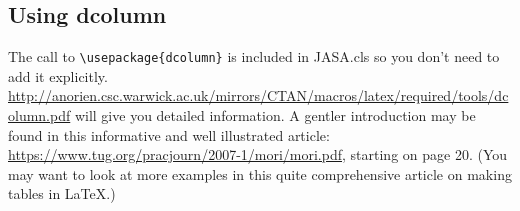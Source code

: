 \documentclass[reprint]{JASA}
\begin{document}
\clearpage


\subsection{Using dcolumn}
The call to \verb+\usepackage{dcolumn}+ is included in JASA.cls so you
don't need to add it explicitly.
\href{http://anorien.csc.warwick.ac.uk/mirrors/CTAN/macros/latex/required/tools/dcolumn.pdf}
{\url{http://anorien.csc.warwick.ac.uk/mirrors/CTAN/macros/latex/required/tools/dcolumn.pdf}}
will give you detailed information.
A gentler introduction may be found in this informative and well
illustrated
article: \href{https://www.tug.org/pracjourn/2007-1/mori/mori.pdf}
{\url{https://www.tug.org/pracjourn/2007-1/mori/mori.pdf}}, starting on page
20. (You may want to look at more examples in this quite comprehensive
article on making tables in \LaTeX.)
\end{document}
